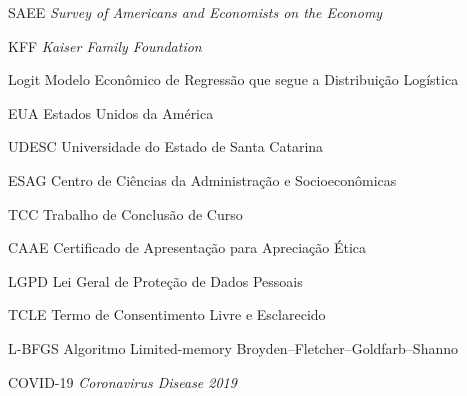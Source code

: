 
\listoffigures*
\cleardoublepage

\listofquadros*
\cleardoublepage


\listoftables*
\cleardoublepage

\begin{siglas}
    \item[SAEE] \textit{Survey of Americans and Economists on the Economy}
    \item[KFF] \textit{Kaiser Family Foundation}
    \item[Logit] Modelo Econômico de Regressão que segue a Distribuição Logística
    \item[EUA] Estados Unidos da América
    \item[UDESC] Universidade do Estado de Santa Catarina
    \item[ESAG] Centro de Ciências da Administração e Socioeconômicas
    \item[TCC] Trabalho de Conclusão de Curso
    \item[CAAE] Certificado de Apresentação para Apreciação Ética
    \item[LGPD] Lei Geral de Proteção de Dados Pessoais
    \item[TCLE] Termo de Consentimento Livre e Esclarecido
    \item[L-BFGS] Algoritmo Limited-memory Broyden–Fletcher–Goldfarb–Shanno
    \item[COVID-19] \textit{Coronavirus Disease 2019}
\end{siglas}




